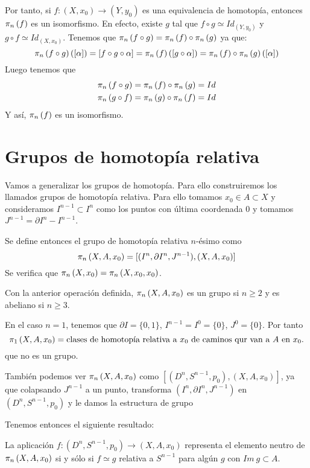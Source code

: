 Por tanto, si $f : (X, x_0) \longrightarrow (Y, y_0)$ es una equivalencia de homotopía, entonces $\pi_{n}\left(f\right)$ es un isomorfismo. En efecto, existe $g$ tal que $f \circ g \simeq Id_{(Y, y_0)}$ y $g \circ f \simeq Id_{(X, x_0)}$. Tenemos que $\pi_{n}\left(f \circ g\right) = \pi_{n}\left(f\right) \circ \pi_{n}\left(g\right)$ ya que:
\[
\pi_{n}\left(f \circ g\right)([\alpha]) = [f \circ g \circ \alpha] = \pi_{n}\left(f\right)([g \circ \alpha]) = \pi_{n}\left(f\right) \circ \pi_{n}\left(g\right)([\alpha])
\]
Luego tenemos que 
\begin{align*}
\pi_{n}\left(f \circ g\right) = \pi_{n}\left(f\right) \circ \pi_{n}\left(g\right) = Id \\
\pi_{n}\left(g \circ f\right) = \pi_{n}\left(g\right) \circ \pi_{n}\left(f\right) = Id
\end{align*}
Y así, $\pi_{n}\left(f\right)$ es un isomorfismo.
\section{Grupos de homotopía relativa}
Vamos a generalizar los grupos de homotopía. Para ello construiremos los llamados grupos de homotopía relativa. Para ello tomamos $x_0 \in A \subset X$ y consideramos $I^{n-1} \subset I^n$ como los puntos con última coordenada $0$ 
y tomamos $J^{n-1} = \partial I^n - I^{n-1}$. \par
Se define entonces el grupo de homotopía relativa $n$-ésimo como
\[
\pi_{n}\left(X, A, x_0\right) = [(I^n, \partial I^n, J^{n-1}), (X, A, x_0)]
\]
Se verifica que $\pi_{n}\left(X, x_0\right) = \pi_{n}\left(X, x_0, x_0\right)$. \par
Con la anterior operación definida, $\pi_{n}\left(X, A, x_0\right)$ es un grupo si $n \geq 2$ y es abeliano si $n \geq 3$. \par
En el caso $n = 1$, tenemos que $\partial I = \{0,1\}$, $I^{n-1} = I^0 = \{0\}$, $J^0 = \{0\}$. Por tanto
\[
\pi_{1}\left(X, A, x_0\right) = \text{clases de homotopía relativa a } x_0 \text{ de caminos qur van a } A \text{ en } x_0.
\]
que no es un grupo. \par
También podemos ver $\pi_{n}\left(X, A, x_0\right)$ como $[(D^n, S^{n-1}, p_0), (X, A, x_0)]$, ya que colapsando $J^{n-1}$ a un punto, transforma $(I^n, \partial I^n, J^{n-1})$ en $(D^n, S^{n-1}, p_0)$ y le damos la estructura de grupo  \par
Tenemos entonces el siguiente resultado:
\begin{teor}
La aplicación $ f : (D^n, S^{n-1}, p_0) \longrightarrow (X, A, x_0)$ representa el elemento neutro de $\pi_{n}\left(X, A, x_0\right)$ si y sólo si $f \simeq g$ relativa a $S^{n-1}$ para algún $g$ con $Im\ g \subset A$.
\end{teor}
